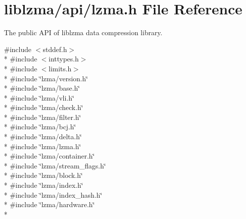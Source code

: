 \section{liblzma/api/lzma.h File Reference}
\label{lzma_8h}


The public A\-P\-I of liblzma data compression library.  


{\ttfamily \#include $<$stddef.\-h$>$}\\*
{\ttfamily \#include $<$inttypes.\-h$>$}\\*
{\ttfamily \#include $<$limits.\-h$>$}\\*
{\ttfamily \#include \char`\"{}lzma/version.\-h\char`\"{}}\\*
{\ttfamily \#include \char`\"{}lzma/base.\-h\char`\"{}}\\*
{\ttfamily \#include \char`\"{}lzma/vli.\-h\char`\"{}}\\*
{\ttfamily \#include \char`\"{}lzma/check.\-h\char`\"{}}\\*
{\ttfamily \#include \char`\"{}lzma/filter.\-h\char`\"{}}\\*
{\ttfamily \#include \char`\"{}lzma/bcj.\-h\char`\"{}}\\*
{\ttfamily \#include \char`\"{}lzma/delta.\-h\char`\"{}}\\*
{\ttfamily \#include \char`\"{}lzma/lzma.\-h\char`\"{}}\\*
{\ttfamily \#include \char`\"{}lzma/container.\-h\char`\"{}}\\*
{\ttfamily \#include \char`\"{}lzma/stream\-\_\-flags.\-h\char`\"{}}\\*
{\ttfamily \#include \char`\"{}lzma/block.\-h\char`\"{}}\\*
{\ttfamily \#include \char`\"{}lzma/index.\-h\char`\"{}}\\*
{\ttfamily \#include \char`\"{}lzma/index\-\_\-hash.\-h\char`\"{}}\\*
{\ttfamily \#include \char`\"{}lzma/hardware.\-h\char`\"{}}\\*
